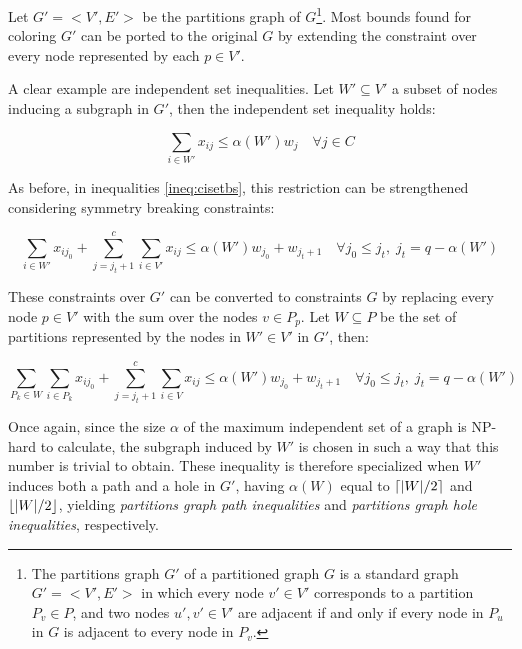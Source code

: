 Let $G' = <V',E'>$ be the partitions graph of $G$\footnote{The partitions graph $G'$ of a partitioned graph $G$ is a standard graph $G'=<V',E'>$ in which every node $v' \in V'$ corresponds to a partition $P_v \in P$, and two nodes $u',v' \in V'$ are adjacent if and only if every node in $P_u$ in $G$ is adjacent to every node in $P_v$.}. Most bounds found for coloring $G'$ can be ported to the original $G$ by extending the constraint over every node represented by each $p \in V'$.

A clear example are independent set inequalities. Let $W' \subseteq V'$ a subset of nodes inducing a subgraph in $G'$, then the independent set inequality holds:

\begin{equation}
\label{ineq:gpiset}
\sum _{i \in W'} x_{ij} \leq \alpha(W') w_{j} \quad \forall j \in C
\end{equation}

As before, in inequalities \ref{ineq:cisetbs}, this restriction can be strengthened considering symmetry breaking constraints:

\begin{equation}
\label{ineq:gpisetbs}
\sum_{i \in W'} x_{ij_0} + \sum ^c _{j = j_t + 1} \sum _{i \in V'} x_{ij} \leq \alpha(W') w_{j_0} + w_{j_t + 1} \quad \forall j_0 \leq j_t, \; j_t = q - \alpha(W')
\end{equation}

These constraints over $G'$ can be converted to constraints $G$ by replacing every node $p \in V'$ with the sum over the nodes $v \in P_p$. Let $W \subseteq P$ be the set of partitions represented by the nodes in $W' \in V'$ in $G'$, then:

\begin{equation}
\label{ineq:gpisetbsg}
\sum_{P_k \in W} \sum_{i \in P_k} x_{ij_0} + \sum ^c _{j = j_t + 1} \sum _{i \in V} x_{ij} \leq \alpha(W') w_{j_0} + w_{j_t + 1} \quad \forall j_0 \leq j_t, \; j_t = q - \alpha(W')
\end{equation}

Once again, since the size $\alpha$ of the maximum independent set of a graph is NP-hard to calculate, the subgraph induced by $W'$ is chosen in such a way that this number is trivial to obtain. These inequality is therefore specialized when $W'$ induces both a path and a hole in $G'$, having $\alpha(W)$ equal to $\left\lceil |W| / 2 \right\rceil$ and $\left\lfloor |W| / 2 \right\rfloor$, yielding \textit{partitions graph path inequalities} and \textit{partitions graph hole inequalities}, respectively.

